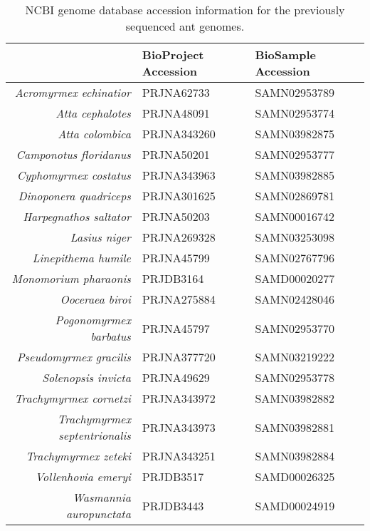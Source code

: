 \begin{table}[ht]
\centering
\begin{tabular}{rll}
  \hline
 & BioProject Accession & BioSample Accession \\ 
  \hline
{\emph{Acromyrmex echinatior}} & PRJNA62733 & SAMN02953789 \\ 
  {\emph{Atta cephalotes}} & PRJNA48091 & SAMN02953774 \\ 
  {\emph{Atta colombica}} & PRJNA343260 & SAMN03982875 \\ 
  {\emph{Camponotus floridanus}} & PRJNA50201 & SAMN02953777 \\ 
  {\emph{Cyphomyrmex costatus}} & PRJNA343963 & SAMN03982885 \\ 
  {\emph{Dinoponera quadriceps}} & PRJNA301625 & SAMN02869781 \\ 
  {\emph{Harpegnathos saltator}} & PRJNA50203 & SAMN00016742 \\ 
  {\emph{Lasius niger}} & PRJNA269328 & SAMN03253098 \\ 
  {\emph{Linepithema humile}} & PRJNA45799 & SAMN02767796 \\ 
  {\emph{Monomorium pharaonis}} & PRJDB3164 & SAMD00020277 \\ 
  {\emph{Ooceraea biroi}} & PRJNA275884 & SAMN02428046 \\ 
  {\emph{Pogonomyrmex barbatus}} & PRJNA45797 & SAMN02953770 \\ 
  {\emph{Pseudomyrmex gracilis}} & PRJNA377720 & SAMN03219222 \\ 
  {\emph{Solenopsis invicta}} & PRJNA49629 & SAMN02953778 \\ 
  {\emph{Trachymyrmex cornetzi}} & PRJNA343972 & SAMN03982882 \\ 
  {\emph{Trachymyrmex septentrionalis}} & PRJNA343973 & SAMN03982881 \\ 
  {\emph{Trachymyrmex zeteki}} & PRJNA343251 & SAMN03982884 \\ 
  {\emph{Vollenhovia emeryi}} & PRJDB3517 & SAMD00026325 \\ 
  {\emph{Wasmannia auropunctata}} & PRJDB3443 & SAMD00024919 \\ 
   \hline
\end{tabular}
\caption{NCBI genome database accession information for the previously sequenced ant genomes.} 
\end{table}
